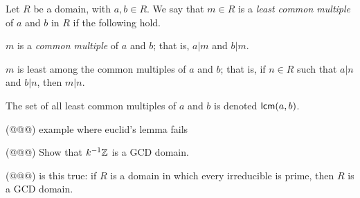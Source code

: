 \begin{dfn}
Let \(R\) be a domain, with \(a,b \in R\).
We say that \(m \in R\) is a \emph{least common multiple} of \(a\) and \(b\) in \(R\) if the following hold.
\begin{proplist}
\item \(m\) is a \emph{common multiple} of \(a\) and \(b\); that is, \(a|m\) and \(b|m\).
\item \(m\) is least among the common multiples of \(a\) and \(b\); that is, if \(n \in R\) such that \(a|n\) and \(b|n\), then \(m|n\).
\end{proplist}
The set of all least common multiples of \(a\) and \(b\) is denoted \(\mathsf{lcm}(a, b)\).
\end{dfn}

\begin{exercise}
(@@@) example where euclid's lemma fails
\end{exercise}

\begin{exercise}
(@@@) Show that \({k}^{-1}\mathbb{Z}\) is a GCD domain.
\end{exercise}

\begin{exercise}
(@@@) is this true: if \(R\) is a domain in which every irreducible is prime, then \(R\) is a GCD domain.
\end{exercise}
